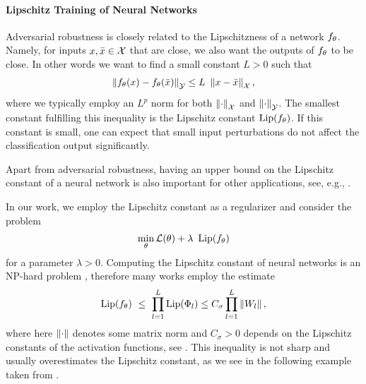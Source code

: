 \paragraph{Lipschitz Training of Neural Networks}
%
Adversarial robustness is closely related to the Lipschitzness of a network $f_\theta$. Namely, for inputs $x,\bar{x}\in\mathcal{X}$ that are close, we also want the outputs of $f_\theta$ to be close. In other words we want to find a small constant $L>0$ such that
%
\begin{align*}
\norm{\net_\param(\inp) - \net_\param(\inpp)}_\Oup \leq L\ \norm{\inp-\inpp}_\Inp,
\end{align*}
%
where we typically employ an $L^p$ norm for both $\left\|\cdot\right\|_{\mathcal{X}}$ and $\left\|\cdot\right\|_{\mathcal{\mathcal{Y}}}$.
%
The smallest constant fulfilling this inequality is the Lipschitz constant $\operatorname{Lip}(f_\theta)$. If this constant is small, one can expect that small input perturbations do not affect the classification output significantly.
%
\begin{remark}{}{}
Apart from adversarial robustness, having an upper bound on the Lipschitz constant of a neural network is also important for other applications, see, e.g., \cite{arndt2023invertible,hasannasab2020parseval, arjovsky2017wasserstein}.
\end{remark}
%
%
\noindent%
In our work, we employ the Lipschitz constant as a regularizer and consider the problem
%
\begin{align}\label{eq:LipReg}
\min_\theta \mathcal{L}(\theta) +\lambda\ \operatorname{Lip}(f_\theta)
\end{align}
%
for a parameter $\lambda>0$. Computing the Lipschitz constant of neural networks is an NP-hard problem \cite{scaman2018lipschitz}, therefore many works employ the estimate
%
\begin{align}\label{ineq:lip_weights}
\operatorname{Lip}(f_\theta) \ \leq \ \prod_{l=1}^L  \operatorname{Lip}(\Phi_l) \leq 
C_\sigma \prod_{l=1}^L \left\|W_l\right\|,
\end{align}
%
where here $\left\|\cdot\right\|$ denotes some matrix norm and $C_\sigma>0$ depends on the Lipschitz constants of the activation functions, see \cite{Anil2019,gouk2020regularisation, Krishnan2020, Roth2020}.
%
This inequality is not sharp and usually overestimates the Lipschitz constant, as we see in the following example taken from \cite{bungert2021clip}.
%
